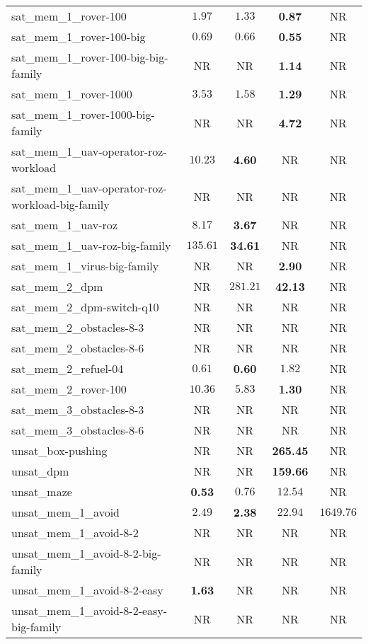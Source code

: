 \begin{tabular}{lcccc}
sat\_mem\_1\_rover-100 & $1.97$ & $1.33$ & \textbf{0.87} & NR \\
sat\_mem\_1\_rover-100-big & $0.69$ & $0.66$ & \textbf{0.55} & NR \\
sat\_mem\_1\_rover-100-big-big-family & NR & NR & \textbf{1.14} & NR \\
sat\_mem\_1\_rover-1000 & $3.53$ & $1.58$ & \textbf{1.29} & NR \\
sat\_mem\_1\_rover-1000-big-family & NR & NR & \textbf{4.72} & NR \\
sat\_mem\_1\_uav-operator-roz-workload & $10.23$ & \textbf{4.60} & NR & NR \\
sat\_mem\_1\_uav-operator-roz-workload-big-family & NR & NR & NR & NR \\
sat\_mem\_1\_uav-roz & $8.17$ & \textbf{3.67} & NR & NR \\
sat\_mem\_1\_uav-roz-big-family & $135.61$ & \textbf{34.61} & NR & NR \\
sat\_mem\_1\_virus-big-family & NR & NR & \textbf{2.90} & NR \\
sat\_mem\_2\_dpm & NR & $281.21$ & \textbf{42.13} & NR \\
sat\_mem\_2\_dpm-switch-q10 & NR & NR & NR & NR \\
sat\_mem\_2\_obstacles-8-3 & NR & NR & NR & NR \\
sat\_mem\_2\_obstacles-8-6 & NR & NR & NR & NR \\
sat\_mem\_2\_refuel-04 & $0.61$ & \textbf{0.60} & $1.82$ & NR \\
sat\_mem\_2\_rover-100 & $10.36$ & $5.83$ & \textbf{1.30} & NR \\
sat\_mem\_3\_obstacles-8-3 & NR & NR & NR & NR \\
sat\_mem\_3\_obstacles-8-6 & NR & NR & NR & NR \\
unsat\_box-pushing & NR & NR & \textbf{265.45} & NR \\
unsat\_dpm & NR & NR & \textbf{159.66} & NR \\
unsat\_maze & \textbf{0.53} & $0.76$ & $12.54$ & NR \\
unsat\_mem\_1\_avoid & $2.49$ & \textbf{2.38} & $22.94$ & $1649.76$ \\
unsat\_mem\_1\_avoid-8-2 & NR & NR & NR & NR \\
unsat\_mem\_1\_avoid-8-2-big-family & NR & NR & NR & NR \\
unsat\_mem\_1\_avoid-8-2-easy & \textbf{1.63} & NR & NR & NR \\
unsat\_mem\_1\_avoid-8-2-easy-big-family & NR & NR & NR & NR \\

\end{tabular}

